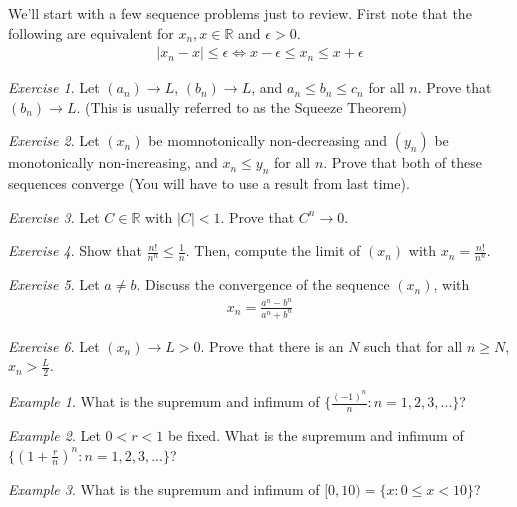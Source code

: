 \documentclass[11pt]{article}
\newcommand{\R}{\ensuremath{\mathbb R}}
\theoremstyle{plain}
\theoremstyle{definition}
\theoremstyle{remark}
\newtheorem{exm}{Example}[section]
\newtheorem{exc}{Exercise}[section]
\begin{document}
We'll start with a few sequence problems just to review. First note that the following are equivalent for $x_n, x \in \R$ and $\epsilon > 0$.
\begin{align*}
    |x_n - x| \leq \epsilon \iff x - \epsilon \leq x_n \leq x + \epsilon
\end{align*}
\begin{exc}
    Let $(a_n) \rightarrow L$, $(b_n) \rightarrow L$, and $a_n \leq b_n \leq c_n$ for all $n$. Prove that $(b_n) \rightarrow L$. (This is usually referred to as the Squeeze Theorem)
\end{exc}
\begin{exc}
    Let $(x_n)$ be momnotonically non-decreasing and $(y_n)$ be monotonically non-increasing, and $x_n \leq y_n$ for all $n$. Prove that both of these sequences converge (You will have to use a result from last time). 
\end{exc}
\begin{exc}
    Let $C \in \R$ with $|C| < 1$. Prove that $C^n \rightarrow 0$.
\end{exc}
\begin{exc}
    Show that $\frac{n!}{n^n} \leq \frac{1}{n}$. Then, compute the limit of $(x_n)$ with $x_n = \frac{n!}{n^n}$.
\end{exc}
\begin{exc}
    Let $a \neq b$. Discuss the convergence of the sequence $(x_n)$, with
    \begin{align*}
        x_n = \frac{a^n - b^n}{a^n + b^n}
    \end{align*}
\end{exc}
\begin{exc}
    Let $(x_n) \rightarrow L > 0$. Prove that there is an $N$ such that for all $n \geq N$, $x_n > \frac{L}{2}$.
\end{exc}

\begin{exm}
    What is the supremum and infimum of $\{\frac{(-1)^n}{n} : n = 1, 2, 3, ...\}$?
\end{exm}
\begin{exm}
    Let $0 < r < 1$ be fixed. What is the supremum and infimum of $\{(1+\frac{r}{n})^n : n = 1, 2, 3, ...\}$? 
\end{exm}
\begin{exm}
    What is the supremum and infimum of $[0, 10) = \{x: 0 \leq x < 10\}$? 
\end{exm}
\end{document}
